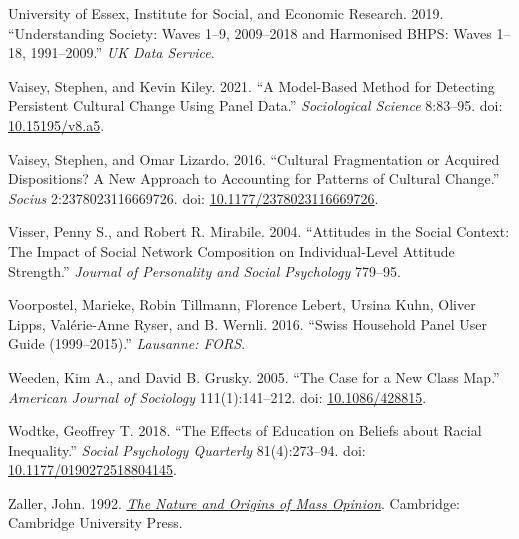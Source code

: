 \documentclass[
  12pt,
]{article}
\newlength{\cslhangindent}
\newlength{\cslentryspacingunit} %
\newenvironment{CSLReferences}[2] %
 {%
  \setlength{\parindent}{0pt}
  \ifodd #1
  \let\oldpar\par
  \def\par{\hangindent=\cslhangindent\oldpar}
  \fi
  \setlength{\parskip}{#2\cslentryspacingunit}
 }%
 {}
\begin{document}
\begin{CSLReferences}{1}{0}
\leavevmode{}%
University of Essex, Institute for Social, and Economic Research. 2019.
{``Understanding Society: Waves 1--9, 2009--2018 and Harmonised BHPS:
Waves 1--18, 1991--2009.''} \emph{UK Data Service}.

\leavevmode{}%
Vaisey, Stephen, and Kevin Kiley. 2021. {``A {Model}-{Based} {Method}
for {Detecting} {Persistent} {Cultural} {Change} {Using} {Panel}
{Data}.''} \emph{Sociological Science} 8:83--95. doi:
\href{https://doi.org/10.15195/v8.a5}{10.15195/v8.a5}.

\leavevmode{}%
Vaisey, Stephen, and Omar Lizardo. 2016. {``Cultural {Fragmentation} or
{Acquired} {Dispositions}? {A} {New} {Approach} to {Accounting} for
{Patterns} of {Cultural} {Change}.''} \emph{Socius} 2:2378023116669726.
doi:
\href{https://doi.org/10.1177/2378023116669726}{10.1177/2378023116669726}.

\leavevmode{}%
Visser, Penny S., and Robert R. Mirabile. 2004. {``Attitudes in the
Social Context: {The} Impact of Social Network Composition on
Individual-Level Attitude Strength.''} \emph{Journal of Personality and
Social Psychology} 779--95.

\leavevmode{}%
Voorpostel, Marieke, Robin Tillmann, Florence Lebert, Ursina Kuhn,
Oliver Lipps, Valérie-Anne Ryser, and B. Wernli. 2016. {``Swiss
Household Panel User Guide (1999--2015).''} \emph{Lausanne: FORS}.

\leavevmode{}%
Weeden, Kim A., and David B. Grusky. 2005. {``The {Case} for a {New}
{Class} {Map}.''} \emph{American Journal of Sociology} 111(1):141--212.
doi: \href{https://doi.org/10.1086/428815}{10.1086/428815}.

\leavevmode{}%
Wodtke, Geoffrey T. 2018. {``The {Effects} of {Education} on {Beliefs}
about {Racial} {Inequality}.''} \emph{Social Psychology Quarterly}
81(4):273--94. doi:
\href{https://doi.org/10.1177/0190272518804145}{10.1177/0190272518804145}.

\leavevmode{}%
Zaller, John. 1992.
\emph{\href{https://doi.org/10.1017/CBO9780511818691}{The {Nature} and
{Origins} of {Mass} {Opinion}}}. Cambridge: Cambridge University Press.

\end{CSLReferences}
\end{document}
